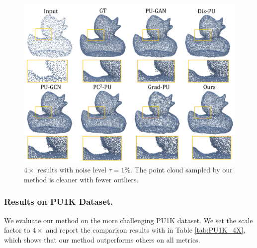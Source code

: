 \documentclass[letterpaper]{article} %
\begin{document}
\begin{figure}
\centering
\includegraphics[width=1.0\linewidth]{robustness_noise.pdf}
\caption{$4\times$ results with noise level $\tau=1\%$. The point cloud sampled by our method is cleaner with fewer outliers.}
\label{fig:robust_noise}
\end{figure}

\subsubsection{Results on PU1K Dataset.}
We evaluate our method on the more challenging PU1K dataset. We set the scale factor to $4\times$ and report the comparison results with \cite{yu2018pu, yifan2019patch, qian2021pu, li2021point, qiu2022pu, dell2022arbitrary, he2023grad} in Table \ref{tab:PU1K_4X}, which shows that our method outperforms others on all metrics. 
\begin{table}
    \small    
    \centering
    \caption{Quantitative comparison between our method and the state-of-the-art methods on the PU-GAN dataset with different noise level $\tau$.}
    \label{tab:PUGAN_noise} 
\end{table}
\end{document}
